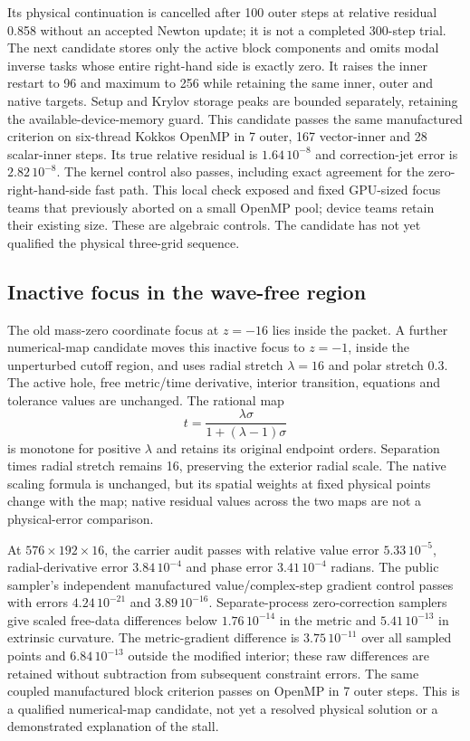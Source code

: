 \documentclass[aps,prd,preprint,notitlepage,nofootinbib]{revtex4-2}
\begin{document}
Its physical continuation is cancelled after 100 outer steps at relative
residual 0.858 without an accepted Newton update; it is not a completed
300-step trial. The next candidate stores only the active block components
and omits modal inverse tasks whose entire right-hand side is exactly zero.
It raises the inner restart to 96 and maximum to 256 while retaining the
same inner, outer and native targets. Setup and Krylov storage peaks are
bounded separately, retaining the available-device-memory guard. This
candidate passes the same manufactured criterion on six-thread Kokkos
OpenMP in 7 outer, 167 vector-inner and 28 scalar-inner steps. Its true
relative residual is $1.64\,10^{-8}$ and correction-jet error is
$2.82\,10^{-8}$. The kernel control also passes, including exact agreement
for the zero-right-hand-side fast path. This local check exposed and fixed
GPU-sized focus teams that previously aborted on a small OpenMP pool;
device teams retain their existing size. These are algebraic controls.
The candidate has not yet qualified the physical three-grid sequence.

\subsection{Inactive focus in the wave-free region}
The old mass-zero coordinate focus at $z=-16$ lies inside the packet.
A further numerical-map candidate moves this inactive focus to $z=-1$,
inside the unperturbed cutoff region, and uses radial stretch $\lambda=16$
and polar stretch 0.3. The active hole, free metric/time derivative,
interior transition, equations and tolerance values are unchanged. The
rational map
\begin{equation}
t=\frac{\lambda\sigma}{1+(\lambda-1)\sigma}
\end{equation}
is monotone for positive $\lambda$ and retains its original endpoint
orders. Separation times radial stretch remains 16, preserving the
exterior radial scale. The native scaling formula is unchanged, but its
spatial weights at fixed physical points change with the map; native
residual values across the two maps are not a physical-error comparison.

At $576\times192\times16$, the carrier audit passes with relative
value error $5.33\,10^{-5}$, radial-derivative error $3.84\,10^{-4}$
and phase error $3.41\,10^{-4}$ radians. The public sampler's independent
manufactured value/complex-step gradient control passes with errors
$4.24\,10^{-21}$ and $3.89\,10^{-16}$. Separate-process zero-correction
samplers give scaled free-data differences below $1.76\,10^{-14}$ in
the metric and $5.41\,10^{-13}$ in extrinsic curvature. The metric-gradient
difference is $3.75\,10^{-11}$ over all sampled points and
$6.84\,10^{-13}$ outside the modified interior; these raw differences
are retained without subtraction from subsequent constraint errors.
The same coupled manufactured block criterion passes on OpenMP in
7 outer steps. This is a qualified numerical-map candidate, not yet a
resolved physical solution or a demonstrated explanation of the stall.
\end{document}
